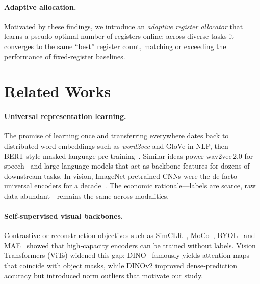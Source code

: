 \documentclass{article}
\newcommand{\citep}{\parencite}
\begin{document}
\paragraph{Adaptive allocation.}
Motivated by these findings, we introduce an \emph{adaptive register allocator} that learns a pseudo‑optimal number of registers online; across diverse tasks it converges to the same “best” register count, matching or exceeding the performance of fixed‑register baselines.

\section{Related Works}
\label{sec:related}

\paragraph{Universal representation learning.}
The promise of learning once and transferring everywhere dates back to distributed word embeddings such as \emph{word2vec} and GloVe in NLP, then BERT‑style masked‑language pre‑training~\citep{devlinBERT2019}.  Similar ideas power wav2vec\,2.0 for speech~\citep{baevskiWav2vec2020} and large language models that act as backbone features for dozens of downstream tasks.  In vision, ImageNet‑pretrained CNNs were the de‑facto universal encoders for a decade~\citep{krizhevskyImageNet2012}.  The economic rationale—labels are scarce, raw data abundant—remains the same across modalities.

\paragraph{Self‑supervised visual backbones.}
Contrastive or reconstruction objectives such as SimCLR~\citep{chenSimCLR2020}, MoCo~\citep{heMoCo2020}, BYOL~\citep{grillBYOL2020} and MAE~\citep{heMAE2022} showed that high‑capacity encoders can be trained without labels.  Vision Transformers (ViTs) widened this gap: DINO~\citep{caronEmergingPropertiesSelfsupervised2021} famously yields attention maps that coincide with object masks, while DINOv2 improved dense‑prediction accuracy but introduced norm outliers that motivate our study.
\end{document}
